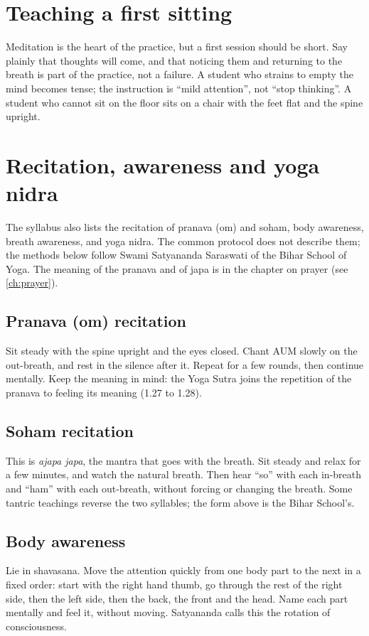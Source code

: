 \section{Teaching a first sitting}

Meditation is the heart of the practice, but a first session should be short. Say plainly that thoughts will come, and that noticing them and returning to the breath is part of the practice, not a failure. A student who strains to empty the mind becomes tense; the instruction is ``mild attention'', not ``stop thinking''. A student who cannot sit on the floor sits on a chair with the feet flat and the spine upright.

\section{Recitation, awareness and yoga nidra}

The syllabus also lists the recitation of pranava (om) and soham, body awareness, breath awareness, and yoga nidra. The common protocol does not describe them; the methods below follow Swami Satyananda Saraswati of the Bihar School of Yoga. The meaning of the pranava and of japa is in the chapter on prayer (see \cref{ch:prayer}).

\subsection*{Pranava (om) recitation}
Sit steady with the spine upright and the eyes closed. Chant AUM slowly on the out-breath, and rest in the silence after it. Repeat for a few rounds, then continue mentally. Keep the meaning in mind: the Yoga Sutra joins the repetition of the pranava to feeling its meaning (1.27 to 1.28).

\subsection*{Soham recitation}
This is \emph{ajapa japa}, the mantra that goes with the breath. Sit steady and relax for a few minutes, and watch the natural breath. Then hear ``so'' with each in-breath and ``ham'' with each out-breath, without forcing or changing the breath. Some tantric teachings reverse the two syllables; the form above is the Bihar School's.

\subsection*{Body awareness}
Lie in shavasana. Move the attention quickly from one body part to the next in a fixed order: start with the right hand thumb, go through the rest of the right side, then the left side, then the back, the front and the head. Name each part mentally and feel it, without moving. Satyananda calls this the rotation of consciousness.

